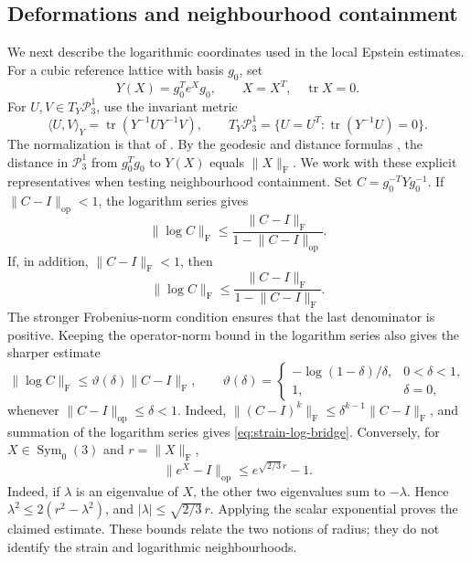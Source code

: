 \documentclass[reqno,english]{amsart}
\theoremstyle{definition}
\newtheorem{open problem}[theorem]{Open Problem}
\theoremstyle{remark}
\theoremstyle{plain}
\numberwithin{equation}{section}
\newcommand{\PP}{\mathcal P_3^1}
\newcommand{\tr}{\operatorname{tr}}
\newcommand{\norm}[1]{\lVert#1\rVert_{\mathrm F}}
\newcommand{\opnorm}[1]{\lVert#1\rVert_{\mathrm{op}}}
\newcommand{\frob}{\mathrm F}
\newcommand{\Symzero}{\operatorname{Sym}_0(3)}
\newcommand{\delog}{\vartheta}
\begin{document}
\subsection{Deformations and neighbourhood containment}\label{E:sec:geometry}\label{T:app:matrices}
We next describe the logarithmic coordinates used in the local Epstein
estimates. For a cubic reference lattice with basis $g_0$, set
\begin{equation}
 Y(X)=g_0^Te^Xg_0,\qquad X=X^T,\quad\tr X=0.
 \label{E:eq:exp-coordinates}
\end{equation}
For $U,V\in T_Y\PP$, use the invariant metric
\[
 \langle U,V\rangle_Y=\tr(Y^{-1}UY^{-1}V),\qquad
 T_Y\PP=\{U=U^T:\tr(Y^{-1}U)=0\}.
\]
The normalization is that of \cite[Section~2, p.~7]{SS}. By the
geodesic and distance formulas \cite[(30)--(31)]{SS}, the distance in
$\PP$ from $g_0^Tg_0$ to $Y(X)$ equals $\norm X$. We work with these
explicit representatives when testing neighbourhood containment. Set
$C=g_0^{-T}Yg_0^{-1}$. If $\opnorm{C-I}<1$, the logarithm series gives
\begin{equation}
 \norm{\log C}\le\frac{\norm{C-I}}{1-\opnorm{C-I}}.
 \label{E:eq:log-norm-bound}
\end{equation}
If, in addition, $\norm{C-I}<1$, then
\[
 \norm{\log C}\le\frac{\norm{C-I}}{1-\norm{C-I}}.
\]
The stronger Frobenius-norm condition ensures that the last denominator
is positive. Keeping the operator-norm bound in the logarithm series
also gives the sharper estimate
\begin{equation}\label{eq:strain-log-bridge}
 \norm{\log C}\le\delog(\delta)\norm{C-I},\qquad
 \delog(\delta)=
 \begin{cases}
 -\log(1-\delta)/\delta,&0<\delta<1,\\
 1,&\delta=0,
 \end{cases}
\end{equation}
whenever $\opnorm{C-I}\le\delta<1$. Indeed,
$\|(C-I)^k\|_{\frob}\le\delta^{k-1}\|C-I\|_{\frob}$, and summation of
the logarithm series gives \eqref{eq:strain-log-bridge}. Conversely, for
$X\in\Symzero$ and $r=\norm X$,
\begin{equation}\label{eq:log-strain-bridge}
 \opnorm{e^X-I}\le e^{\sqrt{2/3}\,r}-1.
\end{equation}
Indeed, if $\lambda$ is an eigenvalue of $X$, the other two eigenvalues
sum to $-\lambda$. Hence $\lambda^2\le2(r^2-\lambda^2)$, and
$|\lambda|\le\sqrt{2/3}\,r$. Applying the scalar exponential proves
the claimed estimate. These bounds relate the two notions of radius;
they do not identify the strain and logarithmic neighbourhoods.
\end{document}
